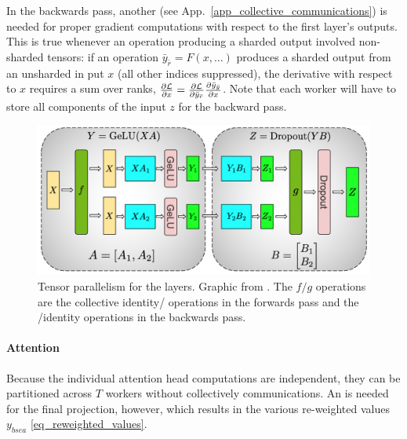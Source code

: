 In the backwards pass, another  (see App.~\ref{app_collective_communications})
is needed for proper gradient computations with respect to the first  layer's
outputs. This is true whenever an operation producing a sharded output involved non-sharded tensors:
if an operation $ \bar{y}_{ \bar{r} }  = F(x, \ldots) $ produces a sharded output from an unsharded
in put $ x $ (all other indices suppressed), the derivative with respect to $ x $ requires a sum
over ranks, $ \frac{ \partial \mathcal{L} }{ \partial x } = \frac{ \partial \mathcal{L} }{ \partial \bar{y} _{
\bar{r} }  } \frac{ \partial \bar{y} _{ \bar{y} } }{ \partial x  }$. Note that each worker will have
to store all components of the input $ z $ for the backward pass.



\begin{figure}[ht]
	\centering
	\includegraphics[scale=.33]{figures/mlp_mp_2.png}
	\caption{Tensor parallelism for the  layers. Graphic from
		\cite{shoeybi2020megatronlm}. The $ f/g $ operations are the collective
		identity/ operations in the forwards pass and the /identity
		operations in the backwards pass.}
	\label{fig_mlp_tensor_parallel}
\end{figure}


\paragraph{Attention} Because the individual attention head computations are independent, they can
be partitioned across $ T $ workers without collectively communications.  An  is
needed for the final projection, however, which results in the various re-weighted values $ y _{
bsea } $ \eqref{eq_reweighted_values}.

